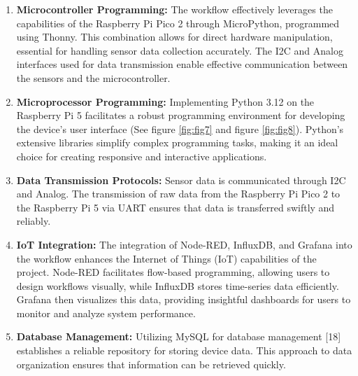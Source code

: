 \documentclass{article}
\begin{document}
\begin{enumerate}
\def\labelenumi{\arabic{enumi}.}
\setcounter{enumi}{1}
\item
  \textbf{Microcontroller Programming:} The workflow effectively
  leverages the capabilities of the Raspberry Pi Pico 2 through
  MicroPython, programmed using Thonny. This combination allows for
  direct hardware manipulation, essential for handling sensor data
  collection accurately. The I2C and Analog interfaces used for data
  transmission enable effective communication between the sensors and
  the microcontroller.
\item
  \textbf{Microprocessor Programming:} Implementing Python 3.12 on the
  Raspberry Pi 5 facilitates a robust programming environment for
  developing the device's user interface (See figure \ref{fig:fig7} and
  figure \ref{fig:fig8}). Python's extensive libraries simplify complex
  programming tasks, making it an ideal choice for creating responsive
  and interactive applications.
\item
  \textbf{Data Transmission Protocols:} Sensor data is communicated
  through I2C and Analog. The transmission of raw data from the
  Raspberry Pi Pico 2 to the Raspberry Pi 5 via UART ensures that data
  is transferred swiftly and reliably.
\item
  \textbf{IoT Integration:} The integration of Node-RED, InfluxDB, and
  Grafana into the workflow enhances the Internet of Things (IoT)
  capabilities of the project. Node-RED facilitates flow-based
  programming, allowing users to design workflows visually, while
  InfluxDB stores time-series data efficiently. Grafana then visualizes
  this data, providing insightful dashboards for users to monitor and
  analyze system performance.
\item
  \textbf{Database Management:} Utilizing MySQL for database management
  {[}18{]} establishes a reliable repository for storing device data.
  This approach to data organization ensures that information can be
  retrieved quickly.
\end{enumerate}
\end{document}
